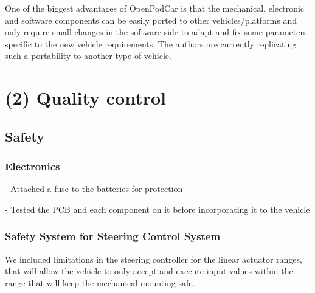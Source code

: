 \documentclass[a4paper]{article}
\begin{document}

One of the biggest advantages of OpenPodCar is that the mechanical, electronic and software components can be easily ported to other vehicles/platforms and only require small changes in the software side to adapt and fix some parameters specific to the new vehicle requirements. The authors are currently replicating such a portability to another type of vehicle. 


\section{(2) Quality control}\label{h.f8237gmzmwc6}

\subsection{Safety}\label{h.v60aduckfisj}


\subsubsection{Electronics}

- Attached a fuse to the batteries for protection

- Tested the PCB and each component on it before incorporating it to the vehicle


\subsubsection{Safety System for Steering Control System}

We included limitations in the steering controller for the linear actuator ranges, that will allow the vehicle to only accept and execute input values within the range that will keep the mechanical mounting safe.
\end{document}
